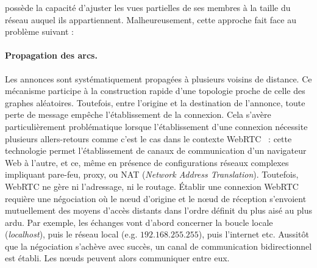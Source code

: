 \SCAMP possède la capacité d'ajuster les vues partielles de ses membres à la
taille du réseau auquel ils appartiennent. Malheureusement, cette approche fait
face au problème suivant :

\paragraph{Propagation des arcs.} Les annonces sont systématiquement propagées à
plusieurs voisins de distance. Ce mécanisme participe à la construction rapide
d'une topologie proche de celle des graphes aléatoires. Toutefois, entre
l'origine et la destination de l'annonce, toute perte de message empêche
l'établissement de la connexion. Cela s'avère particulièrement problématique
lorsque l'établissement d'une connexion nécessite plusieurs allers-retours comme
c'est le cas dans le contexte WebRTC~\cite{webrtc} : 
cette technologie permet l'établissement de canaux de communication d'un
navigateur Web à l'autre, et ce, même en présence de configurations réseaux
complexes impliquant pare-feu, proxy, ou NAT (\emph{Network Address
  Translation}). Toutefois, WebRTC ne gère ni l'adressage, ni le routage.
Établir une connexion WebRTC requière une négociation où le nœud d'origine et le
nœud de réception s'envoient mutuellement des moyens d'accès distants dans
l'ordre définit du plus aisé au plus ardu. Par exemple, les échanges vont
d'abord concerner la boucle locale (\emph{localhost}), puis le réseau local
(e.g. $192.168.255.255$), puis l'internet etc. Aussitôt que la négociation
s'achève avec succès, un canal de communication bidirectionnel est établi. Les
nœuds peuvent alors communiquer entre eux.

